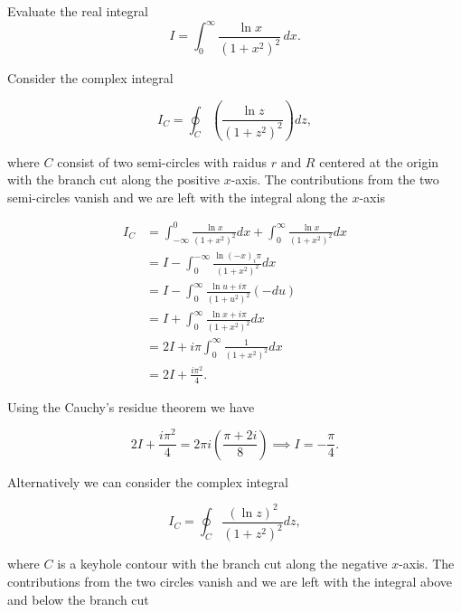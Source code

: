 \documentclass[english,a4paper,12pt]{report}
\begin{document}
{Evaluate the real integral 
\begin{equation}
    I = \int_{0}^{\infty} \frac{\ln x}{(1+x^2)^2}\,dx.
\end{equation}
}
{Consider the complex integral 

\begin{equation}
    I_{C} = \oint_{C} \left( \frac{\ln z}{(1+z^2)^2}  \right) dz,
\end{equation}

where \(C\) consist of two semi-circles with raidus \(r \text { and } R\) centered at the origin with the branch cut along the positive \(x\)-axis. The contributions from the two semi-circles vanish and we are left with the integral along the \(x\)-axis

\begin{equation}
    \begin{aligned} 
    I_{C} &= \int_{-\infty}^{0} \frac{\ln x}{(1+x^2)^2}dx+ \int_{0}^{\infty} \frac{\ln x}{(1+x^2)^2}dx \\
    &= I - \int_{0}^{-\infty} \frac{\ln (-x)_i\pi }{(1+x^2)^2}dx \\
    &= I - \int_{0}^{\infty} \frac{\ln u+i\pi }{(1+u^2)^2}(-du) \\
    &= I + \int_{0}^{\infty} \frac{\ln x+i\pi }{(1+x^2)^2}dx\\
    &= 2I + i\pi \int_{0}^{\infty} \frac{1}{(1+x^2)^2}dx \\
    &=2I + \frac{i\pi ^2}{4}.            
    \end{aligned} 
\end{equation}

Using the Cauchy's residue theorem we have 

\begin{equation}
    2I + \frac{i\pi ^2}{4} = 2\pi i \left( \frac{\pi +2i}{8}  \right) \implies I = -\frac{\pi }{4}.  
\end{equation}

Alternatively we can consider the complex integral 

\begin{equation}
    I_{C} = \oint_{C} \frac{(\ln z)^2}{(1+z^2)^2}dz,  
\end{equation}

where \(C\) is a keyhole contour with the branch cut along the negative \(x\)-axis. The contributions from the two circles vanish and we are left with the integral above and below the branch cut

}
\end{document}
